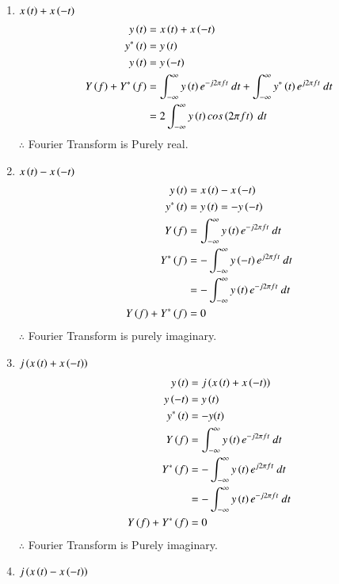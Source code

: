 \documentclass[journal,12pt,twocolumn]{IEEEtran}
\theoremstyle{remark}
\begin{document}
\begin{enumerate}
\item $x\left(t\right) + x\left(-t\right)$\\
\begin{align}
 y\left(t\right)&=x\left(t\right) + x\left(-t\right)\\
 y^*\left(t\right)&=y\left(t\right)\\
 y\left(t\right)&=y\left(-t\right)\\
 Y\left(f\right)+Y^*\left(f\right)&=\int_{-\infty}^{\infty} y\left(t\right) e^{-j 2\pi f t} \ dt+\int_{-\infty}^{\infty} y^*\left(t\right) e^{j 2\pi f t} \ dt\\
 &=2\int_{-\infty}^{\infty} y\left(t\right) cos\left(2 \pi ft\right) \ dt
\end{align}
$\therefore$ Fourier Transform is Purely real.\\
\item $x\left(t\right) - x\left(-t\right)$\\
\begin{align}
  y\brak{t}&=x\brak{t} - x\brak{-t}\\
  y^*\brak{t}&=y\brak{t}=-y\brak{-t}\\
  Y\brak{f}&=\int_{-\infty}^{\infty} y\brak{t} e^{-j 2\pi f t} \ dt\\
  Y^*\brak{f}&=-\int_{-\infty}^{\infty} y\brak{-t} e^{j 2\pi f t} \ dt\\
  &=-\int_{-\infty}^{\infty} y\brak{t} e^{-j 2\pi f t} \ dt\\
  Y\brak{f}+Y^*\brak{f}&=0
\end{align}
$\therefore$ Fourier Transform is purely imaginary.\\
\item $j\left(x\left(t\right) + x\left(-t\right)\right)$
\begin{align}
  y\brak{t}&= j\brak{x\brak{t} + x\brak{-t}}\\
  y\brak{-t}&=y\brak{t}\\
  y^*\brak{t}&=-y(t)\\
  Y\brak{f}&=\int_{-\infty}^{\infty} y\brak{t} e^{-j 2\pi f t} \ dt\\
  Y^*\brak{f}&=-\int_{-\infty}^{\infty} y\brak{t} e^{j 2\pi f t} \ dt\\
  &=-\int_{-\infty}^{\infty} y\brak{t} e^{-j 2\pi f t} \ dt\\
  Y\brak{f}+Y^*\brak{f}&=0
\end{align}
$\therefore$ Fourier Transform is Purely imaginary.\\
\item $j\left(x\left(t\right) - x\left(-t\right)\right)$
\begin{align}

\end{align}
\end{enumerate}
\end{document}
